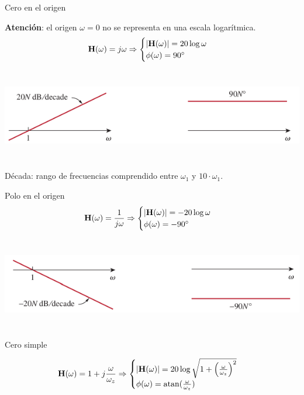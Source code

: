 {Cero en el origen}

\textbf{Atención}: el origen \(\omega = 0\) no se representa en una escala logarítmica.
\label{sec:org10a2611}
\[
  \mathbf{H}(\omega) = j\omega \Rightarrow
  \begin{cases}
    |\mathbf{H}(\omega)| = 20 \log \omega\\
    \phi(\omega) = \ang{90}
  \end{cases}
\]



\begin{center}
\includegraphics[height=4cm]{../figs/BodeCeroOrigen.pdf}
\end{center}

Década: rango de frecuencias comprendido entre \(\omega_1\) y \(10\cdot\omega_1\).

{Polo en el origen}
\[
  \mathbf{H}(\omega) = \frac{1}{j\omega} \Rightarrow
  \begin{cases}
    |\mathbf{H}(\omega)| = - 20 \log \omega\\
    \phi(\omega) = - \ang{90}
  \end{cases}
\]

\begin{center}
\includegraphics[height=4cm]{../figs/BodePoloOrigen.pdf}
\end{center}

{Cero simple}


\[
  \mathbf{H}(\omega) = 1 + j\frac{\omega}{\omega_z} \Rightarrow
  \begin{cases}
    |\mathbf{H}(\omega)| =  20 \log \sqrt{1 + \left(\frac{\omega}{\omega_z}\right)^2}\\
    \phi(\omega) = \mathrm{atan}(\frac{\omega}{\omega_z}) 
  \end{cases}
\]


